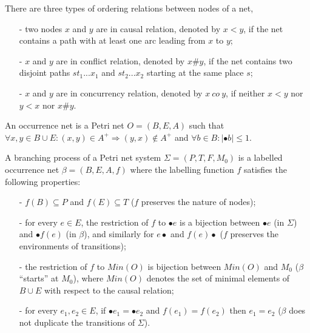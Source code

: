 \documentclass{llncs}
\begin{document}
\begin{definition}\label{def:orderingRelations}
There are three types of ordering relations between nodes of a net,
	\begin{itemize}
		\item[-] two nodes $x$ and $y$ are in causal relation, denoted by $x<y$, if the net contains a path with at least one arc leading from $x$ to $y$;
		\item[-] $x$ and $y$ are in conflict relation, denoted by $x\#y$, if the net contains two disjoint paths $st_{1}...x_{1}$ and $st_{2}...x_{2}$ starting at the same place $s$;
		\item[-] $x$ and $y$ are in concurrency relation, denoted by $x~co~y$, if neither $x<y$ nor $y<x$ nor $x\#y$.
	\end{itemize}
\end{definition}

\begin{definition}\label{def:occurrenceNet}
An occurrence net is a Petri net $O=(B,E,A)$ such that $\forall x,y\in B\cup E:(x,y)
\in A^{+}\Rightarrow(y,x)\notin A^{+}$ and $\forall b\in B:|\bullet b|\leq 1$.
\end{definition}

\begin{definition}\label{def:branchingProcess}
A branching process of a Petri net system $\Sigma=(P,T,F,M_{0})$ is a labelled occurrence net $\beta=(B,E,A,f)$ where the labelling function $f$ satisfies the following properties:
	\begin{itemize}
		\item[-] $f(B)\subseteq P$ and $f(E)\subseteq T$ ($f$ preserves the nature of nodes);
		\item[-] for every $e\in E$, the restriction of $f$ to $\bullet e$ is a bijection between $\bullet e$ (in $\Sigma$) and $\bullet f(e)$ (in $\beta$), and similarly for $e\bullet$ and $f(e)\bullet$ ($f$ preserves the environments of transitions);
		\item[-] the restriction of $f$ to $Min(O)$ is bijection between $Min(O)$ and $M_{0}$ ($\beta$ ``starts'' at $M_{0}$), where $Min(O)$ denotes the set of minimal elements of $B\cup E$ with respect to the causal relation;
		\item[-] for every $e_{1},e_{2}\in E$, if $\bullet e_{1}=\bullet e_{2}$ and $f(e_{1})=f(e_{2})$ then $e_{1}=e_{2}$ ($\beta$ does not duplicate the transitions of $\Sigma$).
	\end{itemize}
\end{definition}
\end{document}
